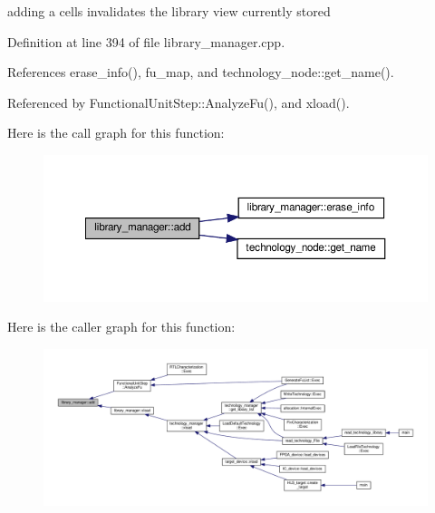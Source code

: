 adding a cells invalidates the library view currently stored 

Definition at line 394 of file library\+\_\+manager.\+cpp.



References erase\+\_\+info(), fu\+\_\+map, and technology\+\_\+node\+::get\+\_\+name().



Referenced by Functional\+Unit\+Step\+::\+Analyze\+Fu(), and xload().

Here is the call graph for this function\+:
\nopagebreak
\begin{figure}[H]
\begin{center}
\leavevmode
\includegraphics[width=350pt]{d8/d35/classlibrary__manager_a7be2eb51058e7ea1f0e7f465f1bc2e19_cgraph}
\end{center}
\end{figure}
Here is the caller graph for this function\+:
\nopagebreak
\begin{figure}[H]
\begin{center}
\leavevmode
\includegraphics[width=350pt]{d8/d35/classlibrary__manager_a7be2eb51058e7ea1f0e7f465f1bc2e19_icgraph}
\end{center}
\end{figure}
\mbox{\label{classlibrary__manager_aceba51458eebf43796ae8e9555410738}} 
